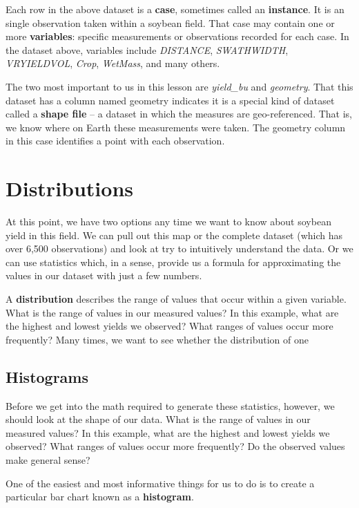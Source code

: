 \documentclass[
]{book}
\begin{document}
Each row in the above dataset is a \textbf{case}, sometimes called an
\textbf{instance}. It is an single observation taken within a soybean field.
That case may contain one or more \textbf{variables}: specific measurements
or observations recorded for each case. In the dataset above, variables
include \emph{DISTANCE}, \emph{SWATHWIDTH}, \emph{VRYIELDVOL}, \emph{Crop}, \emph{WetMass}, and
many others.

The two most important to us in this lesson are \emph{yield\_bu} and
\emph{geometry}. That this dataset has a column named geometry indicates it
is a special kind of dataset called a \textbf{shape file} -- a dataset in
which the measures are geo-referenced. That is, we know where on Earth
these measurements were taken. The geometry column in this case
identifies a point with each observation.

\hypertarget{distributions}{%
\section{Distributions}\label{distributions}}

At this point, we have two options any time we want to know about
soybean yield in this field. We can pull out this map or the complete
dataset (which has over 6,500 observations) and look at try to
intuitively understand the data. Or we can use statistics which, in a
sense, provide us a formula for approximating the values in our dataset
with just a few numbers.

A \textbf{distribution} describes the range of values that occur within a
given variable. What is the range of values in our measured values? In
this example, what are the highest and lowest yields we observed? What
ranges of values occur more frequently? Many times, we want to see
whether the distribution of one

\hypertarget{histograms}{%
\subsection{Histograms}\label{histograms}}

Before we get into the math required to generate these statistics,
however, we should look at the shape of our data. What is the range of
values in our measured values? In this example, what are the highest and
lowest yields we observed? What ranges of values occur more frequently?
Do the observed values make general sense?

One of the easiest and most informative things for us to do is to create
a particular bar chart known as a \textbf{histogram}.
\end{document}
